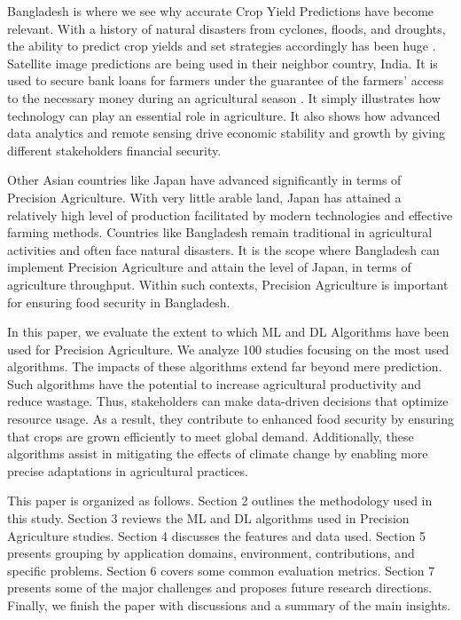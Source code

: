 \documentclass[conference]{IEEEtran}
\begin{document}
Bangladesh is where we see why accurate Crop Yield Predictions have become relevant. With a history of natural disasters from cyclones, floods, and droughts, the ability to predict crop yields and set strategies accordingly has been huge \cite{b3}. Satellite image predictions are being used in their neighbor country, India. It is used to secure bank loans for farmers under the guarantee of the farmers' access to the necessary money during an agricultural season \cite{b4}. It simply illustrates how technology can play an essential role in agriculture. It also shows how advanced data analytics and remote sensing drive economic stability and growth by giving different stakeholders financial security. 

Other Asian countries like Japan have advanced significantly in terms of Precision Agriculture. With very little arable land, Japan has attained a relatively high level of production facilitated by modern technologies and effective farming methods. Countries like Bangladesh remain traditional in agricultural activities and often face natural disasters. It is the scope where Bangladesh can implement Precision Agriculture and attain the level of Japan, in terms of agriculture throughput. Within such contexts, Precision Agriculture is important for ensuring food security in Bangladesh.

In this paper, we evaluate the extent to which ML and DL Algorithms have been used for Precision Agriculture. We analyze 100 studies focusing on the most used algorithms. The impacts of these algorithms extend far beyond mere prediction. Such algorithms have the potential to increase agricultural productivity and reduce wastage. Thus, stakeholders can make data-driven decisions that optimize resource usage. As a result, they contribute to enhanced food security by ensuring that crops are grown efficiently to meet global demand. Additionally, these algorithms assist in mitigating the effects of climate change by enabling more precise adaptations in agricultural practices.

This paper is organized as follows. Section 2 outlines the methodology used in this study. Section 3 reviews the ML and DL algorithms used in Precision Agriculture studies. Section 4 discusses the features and data used. Section 5 presents grouping by application domains, environment, contributions, and specific problems. Section 6 covers some common evaluation metrics. Section 7 presents some of the major challenges and proposes future research directions. Finally, we finish the paper with discussions and a summary of the main insights.
\end{document}
